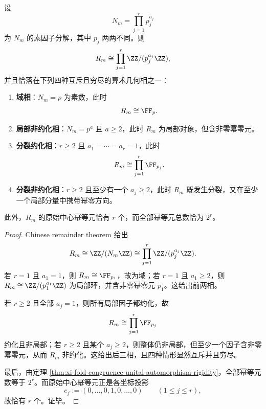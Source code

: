 \begin{theorem}[分辨率算术几何的四相分类]\label{thm:xi-fold-congruence-crt-primitive-idempotents}
设
\[
N_m=\prod_{j=1}^{r}p_j^{a_j}
\]
为 \(N_m\) 的素因子分解，其中 \(p_j\) 两两不同。则
\[
R_m\cong \prod_{j=1}^{r}\ZZ/(p_j^{a_j}\ZZ),
\]
并且恰落在下列四种互斥且穷尽的算术几何相之一：
\begin{enumerate}
  \item \textbf{域相}：\(N_m=p\) 为素数，此时
  \[
  R_m\cong \FF_p.
  \]
  \item \textbf{局部非约化相}：\(N_m=p^a\) 且 \(a\ge 2\)，此时 \(R_m\) 为局部对象，但含非零幂零元。
  \item \textbf{分裂约化相}：\(r\ge 2\) 且 \(a_1=\cdots=a_r=1\)，此时
  \[
  R_m\cong \prod_{j=1}^{r}\FF_{p_j}.
  \]
  \item \textbf{分裂非约化相}：\(r\ge 2\) 且至少有一个 \(a_j\ge 2\)，此时 \(R_m\) 既发生分裂，又在至少一个局部分量中携带幂零方向。
\end{enumerate}
此外，\(R_m\) 的原始中心幂等元恰有 \(r\) 个，而全部幂等元总数恰为 \(2^r\)。
\end{theorem}
\begin{proof}
Chinese remainder theorem 给出
\[
R_m
\cong
\ZZ/(N_m\ZZ)
\cong
\prod_{j=1}^{r}\ZZ/(p_j^{a_j}\ZZ).
\]
若 \(r=1\) 且 \(a_1=1\)，则 \(R_m\cong \FF_{p_1}\)，故为域；若 \(r=1\) 且 \(a_1\ge 2\)，则 \(R_m\cong \ZZ/(p_1^{a_1}\ZZ)\) 为局部环，并含非零幂零元 \(p_1\)。这给出前两相。

若 \(r\ge 2\) 且全部 \(a_j=1\)，则所有局部因子都约化，故
\[
R_m\cong \prod_{j=1}^{r}\FF_{p_j}
\]
约化且非局部；若 \(r\ge 2\) 且某个 \(a_j\ge 2\)，则整体仍非局部，但至少一个因子含非零幂零元，从而 \(R_m\) 非约化。这给出后三相，且四种情形显然互斥并且穷尽。

最后，由定理 \ref{thm:xi-fold-congruence-unital-automorphism-rigidity}，全部幂等元数等于 \(2^r\)。而原始中心幂等元正是各坐标投影
\[
e_j:=(0,\dots,0,1,0,\dots,0)
\qquad
(1\le j\le r),
\]
故恰有 \(r\) 个。证毕。
\end{proof}

